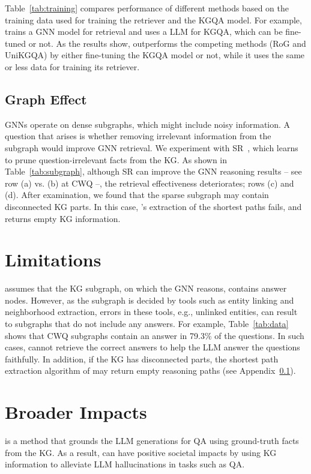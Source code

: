 

Table~\ref{tab:training} compares performance of different methods based on the training data used for training the retriever and the KGQA model. For example, \grag trains a GNN model for retrieval and uses a LLM for KGQA, which can be fine-tuned or not. As the results show, \grag outperforms the  competing methods (RoG and UniKGQA) by either fine-tuning the KGQA model or not, while it uses the same or less data for training its retriever. 


\subsection{Graph Effect} \label{app:subgraph}
GNNs operate on dense subgraphs, which might include noisy information. A question that arises is whether removing irrelevant information from the subgraph would improve GNN retrieval. We experiment with SR~\citep{zhang2022subgraph}, which learns to prune question-irrelevant facts from the KG. As shown in Table~\ref{tab:subgraph}, although SR can improve the GNN reasoning results -- see row (a) vs. (b) at CWQ --, the retrieval effectiveness deteriorates; rows (c) and (d). After examination, we found that the sparse subgraph may contain disconnected KG parts. In this case, \grag's extraction of the shortest paths fails, and \grag returns empty KG information. 



\section{Limitations} \label{app:limit}

\grag assumes that the KG subgraph, on which the GNN reasons, contains answer nodes. However, as the subgraph is decided by tools such as entity linking and neighborhood extraction, errors in these tools, e.g., unlinked entities, can result to subgraphs that do not include any answers. For example, Table~\ref{tab:data} shows that CWQ subgraphs contain an answer in 79.3\% of the questions. In such cases, \grag cannot retrieve the correct answers to help the LLM answer the questions faithfully. In addition, if the KG has disconnected parts, the shortest path extraction algorithm of \grag may return empty reasoning paths (see Appendix~\ref{app:subgraph}).


\section{Broader Impacts} \label{app:impacts}
\grag is a method that grounds the LLM generations for QA using ground-truth facts from the KG. As a result, \grag can have positive societal impacts by using KG information to alleviate LLM hallucinations in tasks such as QA. 


